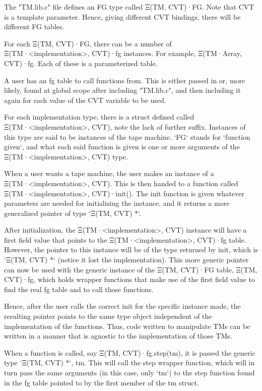\documentclass[11pt]{article}
\begin{document}
The "TM.lib.c" file defines an FG type called Ξ(TM, CVT)·FG. Note that CVT is a template
parameter. Hence, giving different CVT bindings, there will be different FG tables.

For each Ξ(TM, CVT)·FG, there can be a number of Ξ(TM·<implementation>, CVT)·fg instances. For
example, Ξ(TM·Array, CVT)·fg. Each of these is a parameterized table.

A user has an fg table to call functions from. This is either passed in or, more
likely, found at global scope after including "TM.lib.c", and then including it again for
each value of the CVT variable to be used.

For each implementation type, there is a struct defined called Ξ(TM·<implementation>, CVT),
note the lack of further suffix. Instances of this type are said to be instances of the tape
machine. `FG` stands for `function given`, and what each said function is given is one or more arguments of the Ξ(TM·<implementation>, CVT) type.

When a user wants a tape machine, the user makes an instance of a Ξ(TM·<implementation>, CVT).
This is then handed to a function called Ξ(TM·<implementation>, CVT)·init(). The init function is given whatever parameters are needed for initializing the instance, and it returns a more generalized pointer of type `Ξ(TM, CVT) *`.

After initialization, the Ξ(TM·<implementation>, CVT) instance will have a first field value that points to the Ξ(TM·<implementation>, CVT)·fg table. However, the pointer to this instance will be of the type returned by init, which is `Ξ(TM, CVT) *` (notice it lost the implementation). This more generic pointer can now be used with the generic instance of the
Ξ(TM, CVT)·FG table, Ξ(TM, CVT)·fg, which holds wrapper functions that make use of the
first field value to find the real fg table and to call those functions.

Hence, after the user calls the correct init for the specific instance made, the resulting pointer points to the same type object independent of the implementation of the functions. Thus, code written to manipulate TMs can be written in a manner that is agnostic to the implementation of those TMs.

When a function is called, say Ξ(TM, CVT)·fg.step(tm), it is passed the generic type `Ξ(TM, CVT) *`, tm. This will call the step wrapper function, which will in turn pass the same arguments (in this case, only `tm`) to the step function found in the fg table pointed to by the first member of the tm struct.
\end{document}
